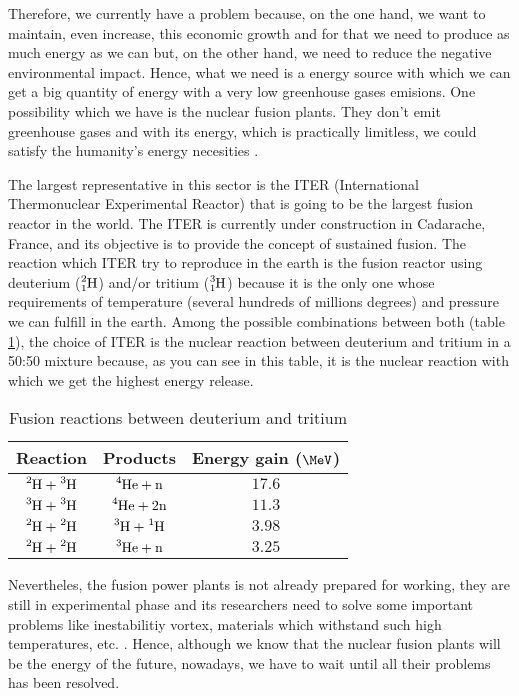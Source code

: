 Therefore, we currently have a problem because, on the one hand, we want to maintain, even increase, this economic growth and for that we need to produce as much energy as we can but, on the other hand, we need to reduce the negative environmental impact. Hence, what we need is a energy source with which we can get a big quantity of energy with a very low greenhouse gases emisions. One possibility which we have is the nuclear fusion plants. They don't emit greenhouse gases and with its energy, which is practically limitless, we could satisfy the humanity's energy necesities .

The largest representative in this sector is the ITER \cite{ITER} (International Thermonuclear Experimental Reactor) that is going to be the largest fusion reactor in the world. The ITER is currently under construction in Cadarache, France, and its objective is to provide the concept of sustained fusion. The reaction which ITER try to reproduce in the earth is the fusion reactor using deuterium ($\ce{^{2}_{1}H}$) and/or tritium ($\ce{^{3}_{1}H}$) because it is the only one whose requirements of temperature (several hundreds of millions degrees) and pressure we can fulfill in the earth. Among the possible combinations between both (table \ref{tab:FusionReactions}), the choice of ITER is the nuclear reaction between deuterium and tritium in a 50:50 mixture because, as you can see in this table,  it is the nuclear reaction with which we get the highest energy release. 

\begin{table}[htbp]
\begin{center}
\begin{tabular}{|c|c|c|}
\hline
Reaction & Products & Energy gain ($\MeV$) \\
\hline \hline \hline
$\ce{^{2}H}+\ce{^{3}H}$ & $\ce{^{4}He}+\ce{n}$ & $17.6$ \\ \hline
$\ce{^{3}H}+\ce{^{3}H}$ & $\ce{^{4}He}+2\ce{n}$ & $11.3$ \\ \hline
$\ce{^{2}H}+\ce{^{2}H}$ & $\ce{^{3}H}+\ce{^{1}H}$ & $3.98$ \\ \hline
$\ce{^{2}H}+\ce{^{2}H}$ & $\ce{^{3}He}+\ce{n}$ & $3.25$ \\ \hline
\end{tabular}
\caption{Fusion reactions between deuterium and tritium\cite{TritiumDocument}}
\label{tab:FusionReactions}
\end{center}
\end{table}

Nevertheles, the fusion power plants is not already prepared for working,  they are still in experimental phase and its researchers need to solve some important problems like inestabilitiy vortex, materials which withstand such high temperatures, etc. \cite{FusionCourse}. Hence, although we know that the nuclear fusion plants will be the energy of the future, nowadays, we have to wait until all their problems has been resolved.

